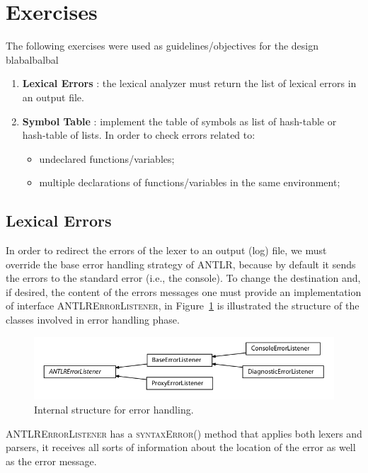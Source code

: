 \documentclass[11pt]{article} %
\begin{document}
\section{Exercises}
\label{sec:exercices}
The following exercises were used as guidelines/objectives for the design 
blabalbalbal

\begin{enumerate}
\item \textbf{Lexical Errors} : the lexical analyzer must return the list of lexical errors in an output file. 
\item \textbf{Symbol Table} : implement the table of symbols as list of hash-table or hash-table of lists. In order to check errors related to:
\begin{itemize}
\item undeclared functions/variables;
\item multiple declarations of functions/variables in the same environment;
\end{itemize}
\end{enumerate}

\subsection{Lexical Errors}
In order to redirect the errors of the lexer to an output (log) file, we must override the base error handling strategy of ANTLR, because by default it sends the errors to the standard error (i.e., the console). To change the destination and, if desired, the content of the errors messages one must provide an implementation of interface \textsc{ANTLRErrorListener}, in Figure~\ref{fig:err} is illustrated the structure of the classes involved in error handling phase.
\begin{figure}
\includegraphics[width=\textwidth]{errorListener.png}
\caption{Internal structure for error handling.}
\label{fig:err}
\end{figure}   
\textsc{ANTLRErrorListener} has a \textsc{syntaxError()} method that applies both lexers and parsers, it receives all sorts of information about the location of the error as well as the error message.     

\medskip
\end{document}
